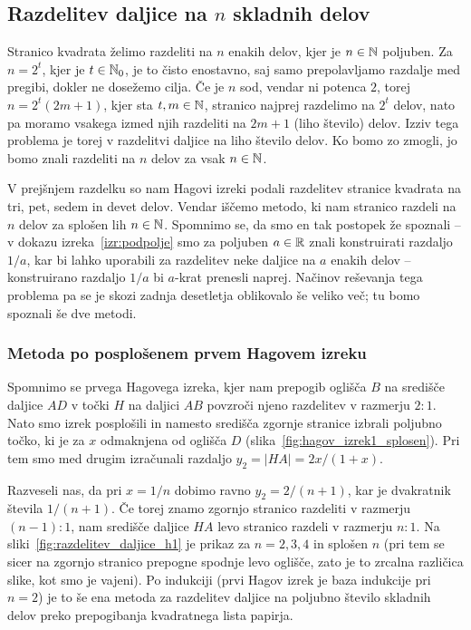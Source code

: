 \subsection{Razdelitev daljice na $n$ skladnih delov}

Stranico kvadrata želimo razdeliti na $n$ enakih delov, kjer je $n \in \mathbb N$ poljuben. Za $n = 2^t$, kjer je $t \in \mathbb N_0$, je to čisto enostavno, saj samo prepolavljamo razdalje med pregibi, dokler ne dosežemo cilja. Če je $n$ sod, vendar ni potenca $2$, torej $n = 2^t(2m + 1)$, kjer sta $t, m \in \mathbb N$, stranico najprej razdelimo na $2^t$ delov, nato pa moramo vsakega izmed njih razdeliti na $2m + 1$ (liho število) delov. Izziv tega problema je torej v razdelitvi daljice na liho število delov. Ko bomo zo zmogli, jo bomo znali razdeliti na $n$ delov za vsak $n \in \mathbb N$.

V prejšnjem razdelku so nam Hagovi izreki podali razdelitev stranice kvadrata na tri, pet, sedem in devet delov. Vendar iščemo metodo, ki nam stranico razdeli na $n$ delov za splošen lih $n \in \mathbb N$. Spomnimo se, da smo en tak postopek že spoznali -- v dokazu izreka~\ref{izr:podpolje} smo za poljuben $a \in \mathbb R$ znali konstruirati razdaljo $1/a$, kar bi lahko uporabili za razdelitev neke daljice na $a$ enakih delov -- konstruirano razdaljo $1/a$ bi $a$-krat prenesli naprej. Načinov reševanja tega problema pa se je skozi zadnja desetletja oblikovalo še veliko več; tu bomo spoznali še dve metodi.

\subsubsection*{Metoda po posplošenem prvem Hagovem izreku}
\label{podpogl:razdelitev_hag1_spl}

Spomnimo se prvega Hagovega izreka, kjer nam prepogib oglišča $B$ na središče daljice $AD$ v točki $H$ na daljici $AB$ povzroči njeno razdelitev v razmerju $2:1$. Nato smo izrek posplošili in namesto središča zgornje stranice izbrali poljubno točko, ki je za $x$ odmaknjena od oglišča $D$ (slika~\ref{fig:hagov_izrek1_splosen}). Pri tem smo med drugim izračunali razdaljo $y_2 = |HA| = 2x/(1+x)$.

Razveseli nas, da pri $x = 1/n$ dobimo ravno $y_2 = 2/(n+1)$, kar je dvakratnik števila $1/(n+1)$. Če torej znamo zgornjo stranico razdeliti v razmerju $(n-1):1$, nam središče daljice $HA$ levo stranico razdeli v razmerju $n:1$. Na sliki~\ref{fig:razdelitev_daljice_h1} je prikaz za $n = 2, 3, 4$ in splošen $n$ (pri tem se sicer na zgornjo stranico prepogne spodnje levo oglišče, zato je to zrcalna različica slike, kot smo je vajeni). Po indukciji (prvi Hagov izrek je baza indukcije pri $n=2$) je to še ena metoda za razdelitev daljice na poljubno število skladnih delov preko prepogibanja kvadratnega lista papirja.

